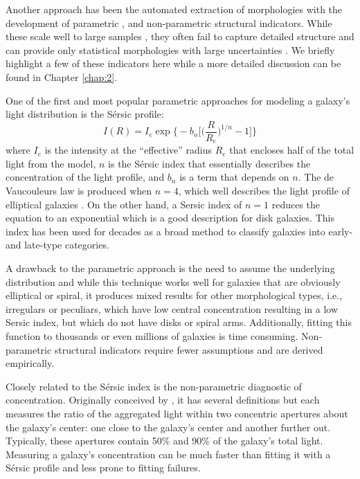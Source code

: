 Another approach has been the automated extraction of morphologies with the development of parametric \citep{Sersic1968, Odewahn2002, Peng2002}, and non-parametric 
\citep{Abraham1994, 
	   Conselice2003, 
	   Abraham2003, 
	   Lotz2004,  
	   Freeman2013} 
structural indicators. While these scale well to large samples 
\citep[e.g.,][]{Simard2011, 
			Griffith2012, 
			Casteels2014, 
			Holwerda2014, 
			Meert2016}, 
they often fail to capture detailed structure and can provide only statistical morphologies with large uncertainties \cite[e.g.,][]{Abraham1996, Bershady2000}. We briefly highlight a few of these indicators here while a more detailed discussion can be found in Chapter \ref{chap:2}. 

One of the first and most popular parametric approaches for modeling a galaxy's light distribution is the S\'ersic profile:
\begin{equation}
I(R) = I_e \exp \Big\{-b_n\Big[\Big(\frac{R}{R_e}\Big)^{1/n}-1\Big]\Big\}
\end{equation}
where $I_e$ is the intensity at the ``effective'' radius $R_e$ that encloses half of the total light from the model, $n$ is the S\'ersic index that essentially describes the concentration of the light profile, and $b_n$ is a term that depends on $n$. The de Vaucouleurs law is produced when $n=4$, which well describes the light profile of elliptical galaxies \citep{deVaucouleurs1948}. On the other hand, a Sersic index of $n=1$ reduces the equation to an exponential which is a good description for disk galaxies. This index has been used for decades as a broad method to classify galaxies into early- and late-type categories. 

A drawback to the parametric approach is the need to assume the underlying distribution and while this technique works well for galaxies that are obviously elliptical or spiral, it produces mixed results for other morphological types, i.e., irregulars or peculiars, which have low central concentration resulting in a low Sersic index, but which do not have disks or spiral arms. Additionally, fitting this function to thousands or even millions of galaxies is time consuming. Non-parametric structural indicators require fewer assumptions and are derived empirically.

Closely related to the S\'ersic index is the non-parametric diagnostic of concentration. Originally conceived by \cite{Abraham1996}, it has several definitions but each measures the ratio of the aggregated light within two concentric apertures about the galaxy's center: one close to the galaxy's center and another further out. Typically, these apertures contain 50\% and 90\% of the galaxy's total light. Measuring a galaxy's concentration can be much faster than fitting it with a S\'ersic profile and less prone to fitting failures. 

